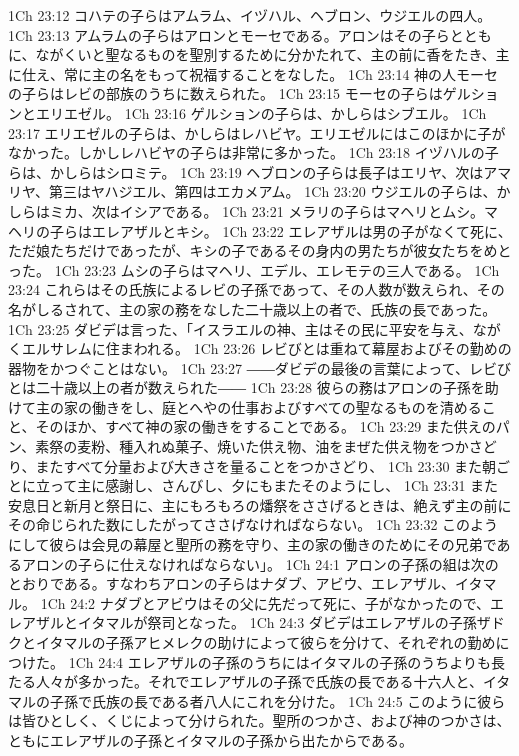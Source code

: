 1Ch 23:12  コハテの子らはアムラム、イヅハル、ヘブロン、ウジエルの四人。
1Ch 23:13  アムラムの子らはアロンとモーセである。アロンはその子らとともに、ながくいと聖なるものを聖別するために分かたれて、主の前に香をたき、主に仕え、常に主の名をもって祝福することをなした。
1Ch 23:14  神の人モーセの子らはレビの部族のうちに数えられた。
1Ch 23:15  モーセの子らはゲルションとエリエゼル。
1Ch 23:16  ゲルションの子らは、かしらはシブエル。
1Ch 23:17  エリエゼルの子らは、かしらはレハビヤ。エリエゼルにはこのほかに子がなかった。しかしレハビヤの子らは非常に多かった。
1Ch 23:18  イヅハルの子らは、かしらはシロミテ。
1Ch 23:19  ヘブロンの子らは長子はエリヤ、次はアマリヤ、第三はヤハジエル、第四はエカメアム。
1Ch 23:20  ウジエルの子らは、かしらはミカ、次はイシアである。
1Ch 23:21  メラリの子らはマヘリとムシ。マヘリの子らはエレアザルとキシ。
1Ch 23:22  エレアザルは男の子がなくて死に、ただ娘たちだけであったが、キシの子であるその身内の男たちが彼女たちをめとった。
1Ch 23:23  ムシの子らはマヘリ、エデル、エレモテの三人である。
1Ch 23:24  これらはその氏族によるレビの子孫であって、その人数が数えられ、その名がしるされて、主の家の務をなした二十歳以上の者で、氏族の長であった。
1Ch 23:25  ダビデは言った、「イスラエルの神、主はその民に平安を与え、ながくエルサレムに住まわれる。
1Ch 23:26  レビびとは重ねて幕屋およびその勤めの器物をかつぐことはない。
1Ch 23:27  ――ダビデの最後の言葉によって、レビびとは二十歳以上の者が数えられた――
1Ch 23:28  彼らの務はアロンの子孫を助けて主の家の働きをし、庭とへやの仕事およびすべての聖なるものを清めること、そのほか、すべて神の家の働きをすることである。
1Ch 23:29  また供えのパン、素祭の麦粉、種入れぬ菓子、焼いた供え物、油をまぜた供え物をつかさどり、またすべて分量および大きさを量ることをつかさどり、
1Ch 23:30  また朝ごとに立って主に感謝し、さんびし、夕にもまたそのようにし、
1Ch 23:31  また安息日と新月と祭日に、主にもろもろの燔祭をささげるときは、絶えず主の前にその命じられた数にしたがってささげなければならない。
1Ch 23:32  このようにして彼らは会見の幕屋と聖所の務を守り、主の家の働きのためにその兄弟であるアロンの子らに仕えなければならない」。
1Ch 24:1  アロンの子孫の組は次のとおりである。すなわちアロンの子らはナダブ、アビウ、エレアザル、イタマル。
1Ch 24:2  ナダブとアビウはその父に先だって死に、子がなかったので、エレアザルとイタマルが祭司となった。
1Ch 24:3  ダビデはエレアザルの子孫ザドクとイタマルの子孫アヒメレクの助けによって彼らを分けて、それぞれの勤めにつけた。
1Ch 24:4  エレアザルの子孫のうちにはイタマルの子孫のうちよりも長たる人々が多かった。それでエレアザルの子孫で氏族の長である十六人と、イタマルの子孫で氏族の長である者八人にこれを分けた。
1Ch 24:5  このように彼らは皆ひとしく、くじによって分けられた。聖所のつかさ、および神のつかさは、ともにエレアザルの子孫とイタマルの子孫から出たからである。
